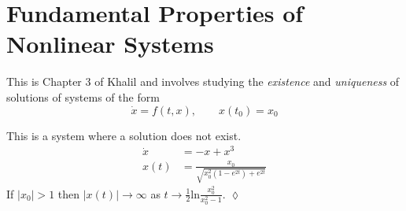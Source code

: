 \section{Fundamental Properties of Nonlinear Systems}
This is Chapter 3 of Khalil and involves studying the \textit{existence} and \textit{uniqueness} of solutions of systems of the form
$$\dot{x} = f(t,x), \qquad x(t_0) = x_0$$

\begin{example}
This is a system where a solution does not exist.
\begin{align*}
\dot{x} &= -x + x^3 \\
x(t) &= \frac{x_0}{\sqrt{x_0^2(1-e^{2t}) + e^{2t}}}
\end{align*}
If $|x_0|>1$ then $|x(t)|\to\infty$ as $t\to\tfrac{1}{2}\text{ln}\frac{x_0^2}{x_0^2-1}$.
$\lozenge$
\end{example}
